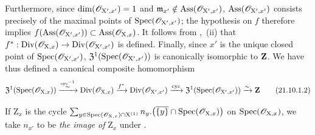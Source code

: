 \begin{env}[21.10.1]
\begin{enumerate}[label=\arabic*\textsuperscript{o}]
Furthermore, since $\dim(\mathscr{O}_{\mathrm{X}',x'})=1$ and $\mathfrak{m}_{x'}\notin\operatorname{Ass}(\mathscr{O}_{\mathrm{X}',x'})$, $\operatorname{Ass}(\mathscr{O}_{\mathrm{X}',x'})$ consists precisely of the maximal points of $\operatorname{Spec}(\mathscr{O}_{\mathrm{X}',x'})$; the hypothesis on $f$ therefore implies
$f(\operatorname{Ass}(\mathscr{O}_{\mathrm{X}',x'}))\subset\operatorname{Ass}(\mathscr{O}_{\mathrm{X},x})$.
It follows from ,{}~(ii) that $f^*:\operatorname{Div}(\mathscr{O}_{\mathrm{X},x})\to\operatorname{Div}(\mathscr{O}_{\mathrm{X}',x'})$ is defined.
Finally, since $x'$ is the unique closed point of $\operatorname{Spec}(\mathscr{O}_{\mathrm{X}',x'})$, $\mathfrak{Z}^1(\operatorname{Spec}(\mathscr{O}_{\mathrm{X}',x'}))$ is canonically isomorphic to $\mathbf{Z}$.
We have thus defined a canonical composite homomorphism
\[
\label{IV.21.10.1.2}
  \mathfrak{Z}^1(\operatorname{Spec}(\mathscr{O}_{\mathrm{X},x})) \xrightarrow{\overset{\operatorname{cyc}^{-1}}{\sim}} \operatorname{Div}(\mathscr{O}_{\mathrm{X},x}) \xrightarrow{f^*} \operatorname{Div}(\mathscr{O}_{\mathrm{X}',x'}) \xrightarrow{\operatorname{cyc}} \mathfrak{Z}^1(\operatorname{Spec}(\mathscr{O}_{\mathrm{X}',x'})) \xrightarrow{\sim} \mathbf{Z}
  \tag{21.10.1.2}
\]
\end{enumerate}

If $\mathrm{Z}_x$ is the cycle
$\sum_{y\in\operatorname{Spec}(\mathscr{O}_{\mathrm{X},x})\cap\mathrm{X}^{(1)}}n_y.\bigl(\overline{\{y\}}\cap\operatorname{Spec}(\mathscr{O}_{\mathrm{X},x})\bigr)$ on $\operatorname{Spec}(\mathscr{O}_{\mathrm{X},x})$, we take $n_{x'}$ to be \emph{the image of} $\mathrm{Z}_x$ under .
\end{env}

